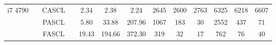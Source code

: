 \documentclass[11pt]{report}
\begin{document}
\begin{table}[h]
{{\begin{tabular}{r|c|c|c c c c| c c c| c c c}
        \hline
        \hline
        \multirow{3}{*}{\begin{minipage}{0.5in}\centering i7 4790\end{minipage}}     & \multirow{3}{*}{\begin{minipage}{0.5in}\centering 3592\end{minipage}}
                                                                                     & CASCL                                                                                 &                                            & 2.34 & 2.38                                                      & 2.24                                              & 2645                                                       & 2600         & 2763         & 6325         & 6218         & 6607                        \\
                                                                                     &                                                                                       & PASCL                                      &      & 5.80                                                      & 33.88                                             & 207.96                                                     & 1067         & 183          & 30           & 2552         & 437          & 71           \\
                                                                                     &                                                                                       & FASCL                                      &      & 19.43                                                     & 194.66                                            & 372.30                                                     & 319          & 32           & 17           & 762          & 76           & 40           \\


\end{tabular}}}
\end{table}
\end{document}

